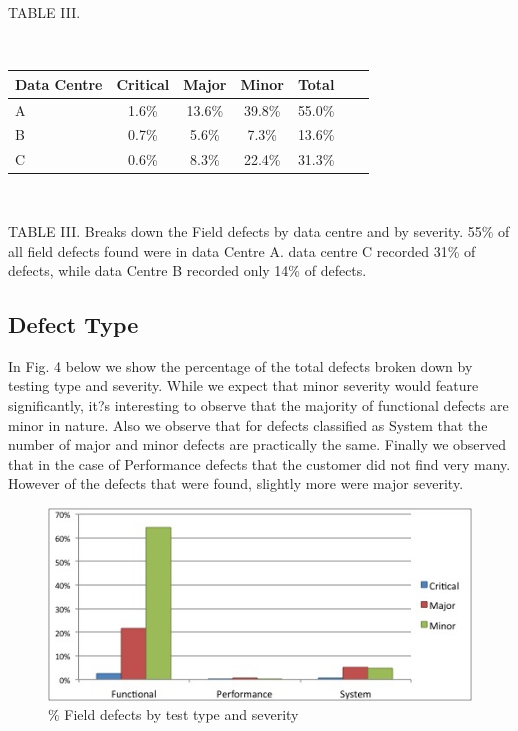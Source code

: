 \documentclass[conference]{IEEEtran}
\begin{document}
TABLE III. 

\ \

\begin{tabular}{l*{5}{c}r} Data Centre & Critical & Major & Minor &  Total \\ \hline A & 1.6\%	 & 13.6\%	& 39.8\%	& 55.0\% \\ B & 0.7\% & 5.6\% & 7.3\% & 13.6\% \\ C	& 0.6\% & 8.3\% & 22.4\%	 & 31.3\%   \end{tabular}

\ \

TABLE III. Breaks down the Field defects by data centre and by severity.  55\% of all field defects found were in data Centre A. data centre C recorded 31\% of defects, while data Centre B recorded only 14\% of defects. 

\subsection{Defect Type}

In Fig. 4 below we show the percentage of the total defects broken down by testing type and severity. While we expect that minor severity would feature significantly, it?s interesting to observe that the majority of functional defects are minor in nature. Also we observe that for defects classified as System that the number of major and minor defects are practically the same. Finally we observed that in the case of Performance defects that the customer did not find very many. However of the defects that were found, slightly more were major severity.

\begin{figure}[h]
\caption{\% Field defects by test type and severity}
\begin{center}
\includegraphics[width=\columnwidth]{graphs/graph4.jpg} 
\end{center}
\label{fig:defecttesttype}
\end{figure}
\end{document}
